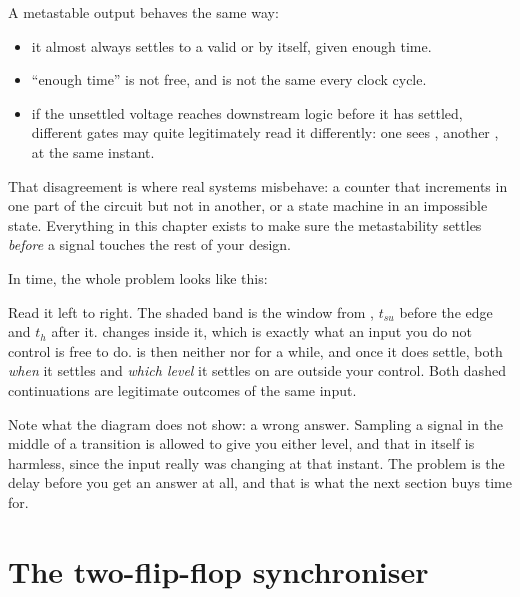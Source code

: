 A metastable output behaves the same way:
\begin{itemize}
  \item it almost always settles to a valid  or  by itself, given enough time.
  \item ``enough time'' is not free, and is not the same every clock cycle.
  \item if the unsettled voltage reaches downstream logic before it has settled, different gates
    may quite legitimately read it differently: one sees , another , at the same
    instant.
\end{itemize}

That disagreement is where real systems misbehave: a counter that increments in one part of the
circuit but not in another, or a state machine in an impossible state. Everything in this chapter
exists to make sure the metastability settles \emph{before} a signal touches the rest of your
design.

In time, the whole problem looks like this:


Read it left to right. The shaded band is the window from , $t_{su}$ before
the edge and $t_h$ after it.  changes inside it, which is exactly what an input you do not
control is free to do.  is then neither  nor  for a while, and once it does
settle, both \emph{when} it settles and \emph{which level} it settles on are outside your control.
Both dashed continuations are legitimate outcomes of the same input.

Note what the diagram does not show: a wrong answer. Sampling a signal in the middle of a
transition is allowed to give you either level, and that in itself is harmless, since the input
really was changing at that instant. The problem is the delay before you get an answer at all, and
that is what the next section buys time for.

\section{The two-flip-flop synchroniser}
\label{c4:sec:sync}

